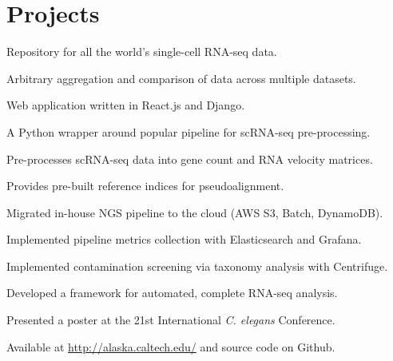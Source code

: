 \documentclass[]{resume}
\begin{document}
\hfill
\begin{minipage}[t]{0.66\textwidth}


\section{Projects}
\vspace{\topsep} %
\begin{tightemize}
\item Repository for all the world's single-cell RNA-seq data.
\item Arbitrary aggregation and comparison of data across multiple datasets.
\item Web application written in React.js and Django.
\end{tightemize}
\sectionsep

\begin{tightemize}
\item A Python wrapper around popular pipeline for scRNA-seq pre-processing.
\item Pre-processes scRNA-seq data into gene count and RNA velocity matrices.
\item Provides pre-built reference indices for pseudoalignment.
\end{tightemize}
\sectionsep

\begin{tightemize}
\item Migrated in-house NGS pipeline to the cloud (AWS S3, Batch, DynamoDB).
\item Implemented pipeline metrics collection with Elasticsearch and Grafana.
\item Implemented contamination screening via taxonomy analysis with Centrifuge.
\end{tightemize}
\sectionsep

\begin{tightemize}
\item Developed a framework for automated, complete RNA-seq analysis.
\item Presented a poster at the 21st International \textit{C. elegans} Conference.
\item Available at \textcolor{blue}{ \href{http://alaska.caltech.edu/}{http://alaska.caltech.edu/}} and source code on Github.
\end{tightemize}
\sectionsep


\end{minipage}
\end{document}
